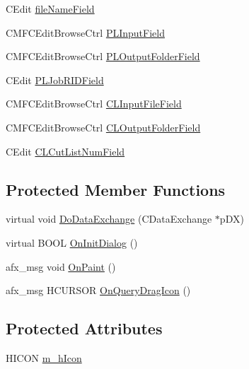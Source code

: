 \begin{DoxyCompactItemize}
C\+Edit \hyperlink{class_c_m_f_c_application1_dlg_abd4a0c013957ccaed2a1473427a07445}{file\+Name\+Field}
\item 
C\+M\+F\+C\+Edit\+Browse\+Ctrl \hyperlink{class_c_m_f_c_application1_dlg_a3985768a1ed6dc29d2955d2d9e79b5f4}{P\+L\+Input\+Field}
\item 
C\+M\+F\+C\+Edit\+Browse\+Ctrl \hyperlink{class_c_m_f_c_application1_dlg_a1d879d718aca13959251142370263115}{P\+L\+Output\+Folder\+Field}
\item 
C\+Edit \hyperlink{class_c_m_f_c_application1_dlg_aa8de39257e4789cf7dff2c9a41eee188}{P\+L\+Job\+R\+I\+D\+Field}
\item 
C\+M\+F\+C\+Edit\+Browse\+Ctrl \hyperlink{class_c_m_f_c_application1_dlg_a65e440c87387881d958c81321d021ba1}{C\+L\+Input\+File\+Field}
\item 
C\+M\+F\+C\+Edit\+Browse\+Ctrl \hyperlink{class_c_m_f_c_application1_dlg_abc02d138ddaf55223327d3c158c33598}{C\+L\+Output\+Folder\+Field}
\item 
C\+Edit \hyperlink{class_c_m_f_c_application1_dlg_a1417718eb1c0d3a976a29040af69af51}{C\+L\+Cut\+List\+Num\+Field}
\end{DoxyCompactItemize}
\subsection*{Protected Member Functions}
\begin{DoxyCompactItemize}
\item 
virtual void \hyperlink{class_c_m_f_c_application1_dlg_a910965ed3c9cb69339a8525306213d50}{Do\+Data\+Exchange} (C\+Data\+Exchange $\ast$p\+D\+X)
\item 
virtual B\+O\+O\+L \hyperlink{class_c_m_f_c_application1_dlg_af0cb1f361523ceaf9a2ad4afad20eded}{On\+Init\+Dialog} ()
\item 
afx\+\_\+msg void \hyperlink{class_c_m_f_c_application1_dlg_aa4b59a9566e7adcc6d0c9fdfa9026b04}{On\+Paint} ()
\item 
afx\+\_\+msg H\+C\+U\+R\+S\+O\+R \hyperlink{class_c_m_f_c_application1_dlg_a1db4b13ca156ef768320941d22649b93}{On\+Query\+Drag\+Icon} ()
\end{DoxyCompactItemize}
\subsection*{Protected Attributes}
\begin{DoxyCompactItemize}
\item 
H\+I\+C\+O\+N \hyperlink{class_c_m_f_c_application1_dlg_a1a0a673483d11ad8d5bfea888c2a00cd}{m\+\_\+h\+Icon}
\end{DoxyCompactItemize}


